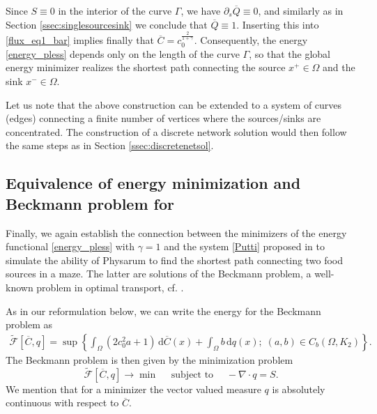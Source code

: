 \documentclass{article}
\numberwithin{equation}{section}
\def\d{\,\mathrm{d}}
\begin{document}
Since $S\equiv 0$ in the interior of the curve $\Gamma$, we have $\partial_s\overline{Q}\equiv 0$,
and similarly as in Section \ref{ssec:singlesourcesink} we conclude that $\overline{Q}\equiv 1$.
Inserting this into \eqref{flux_eq1_bar} implies finally that $\overline{C}=c_0^{\frac{2}{1+\gamma}}$.
Consequently, the energy \eqref{energy_pless} depends only on the length of the curve $\Gamma$,
so that the global energy minimizer realizes the shortest path connecting
the source $x^+\in\Omega$ and the sink $x^-\in\Omega$.

Let us note that the above construction can be extended to a system of curves (edges) connecting a finite number
of vertices where the sources/sinks are concentrated. The construction of a discrete network solution
would then follow the same steps as in Section \ref{ssec:discretenetsol}.


\subsection{Equivalence of energy minimization and Beckmann problem for }
Finally, we again establish the connection between the minimizers of the energy functional \eqref{energy_pless} with $\gamma=1$
and the system \eqref{Putti} proposed in \cite{facca2018towards} to simulate the
ability of Physarum to find the shortest path connecting two food sources in a maze. The latter are solutions of the Beckmann problem, a well-known problem in optimal transport,
cf. \cite{santambrogio2015optimal}.

As in our reformulation below, we can write the energy for the Beckmann problem as
 \begin{align} \label{BeckmannF}
   \widetilde{\mathcal{F}}[\overline{C},q] = \sup \left\{  \int_\Omega (2 c_0^2 a + 1) \d \overline C(x) %
   +  \int_\Omega b \d  q(x);\;
      (a,b)\in C_b(\Omega, K_2) \right\}.
\end{align}
The Beckmann problem is then given by the minimization problem
\begin{equation} \label{Beckmann}
     \widetilde{\mathcal{F}}[\overline{C},q] \rightarrow \min \quad \text{ subject to } \quad - \nabla \cdot q = S.
\end{equation} 
We mention that for a minimizer the vector valued measure $q$ is absolutely continuous with respect to $\overline{C}$. 
\end{document}
